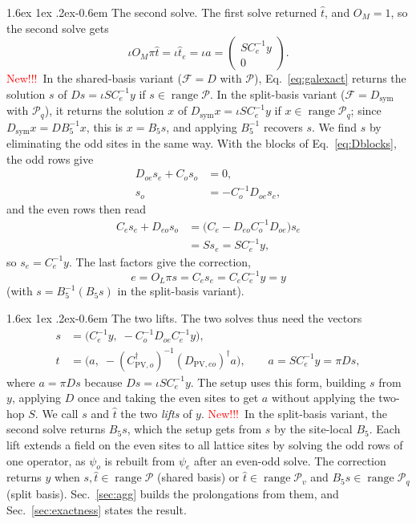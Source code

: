 \documentclass[11pt,a4paper]{article}
\makeatletter
\newif\ifshownew \shownewtrue
\DeclareRobustCommand\New{\ifshownew\textcolor{red}{New!!!}\ \else\ignorespaces\fi}
\renewcommand\paragraph{\@startsection{paragraph}{4}{\z@}%
  {1.6ex \@plus 1ex \@minus .2ex}{-0.6em}%
  {\normalfont\normalsize\itshape}}
\numberwithin{equation}{section}
\newcommand{\dg}{^{\dagger}}
\newcommand{\Pro}{\mathcal P}
\newcommand{\Pq}{\Pro_q}
\newcommand{\Pv}{\Pro_v}
\newcommand{\Dsym}{D_{\mathrm{sym}}}
\newcommand{\Ce}{C_{e}}
\newcommand{\Co}{C_{o}}
\newcommand{\Cpvo}{C_{\mathrm{PV},o}}
\makeatother
\begin{document}
\paragraph{The second solve.} The first solve returned $\hat t$, and $O_M=1$, so the second solve
gets
\begin{equation*}
\iota O_M\pi\hat t=\iota\hat t_e=\iota a=\begin{pmatrix}S\Ce^{-1}y\\0\end{pmatrix}.
\end{equation*}
\New In the shared-basis variant ($\mathcal F=D$ with $\Pro$), Eq.~\eqref{eq:galexact} returns the
solution $s$ of $Ds=\iota S\Ce^{-1}y$ if $s\in\operatorname{range}\Pro$. In the split-basis variant
($\mathcal F=\Dsym$ with $\Pq$), it returns the solution $x$ of $\Dsym x=\iota S\Ce^{-1}y$ if
$x\in\operatorname{range}\Pq$; since $\Dsym x=DB_5^{-1}x$, this is $x=B_5s$, and applying
$B_5^{-1}$ recovers $s$. We find $s$ by eliminating the odd sites in the same way. With the blocks of
Eq.~\eqref{eq:Dblocks}, the odd rows give
\begin{align*}
D_{oe}s_e+\Co s_o&=0,\\
s_o&=-\Co^{-1}D_{oe}s_e ,
\end{align*}
and the even rows then read
\begin{align*}
\Ce s_e+D_{eo}s_o&=\big(\Ce-D_{eo}\Co^{-1}D_{oe}\big)s_e\\
&=Ss_e=S\Ce^{-1}y ,
\end{align*}
so $s_e=\Ce^{-1}y$. The last factors give the correction,
\begin{equation*}
e=O_L\pi s=\Ce s_e=\Ce\Ce^{-1}y=y
\end{equation*}
(with $s=B_5^{-1}(B_5s)$ in the split-basis variant).

\paragraph{The two lifts.} The two solves thus need the vectors
\begin{equation}
\begin{aligned}
s&=\big(\Ce^{-1}y,\;-\Co^{-1}D_{oe}\Ce^{-1}y\big),\\
\hat t&=\big(a,\;-(\Cpvo\dg)^{-1}(D_{\mathrm{PV},eo})\dg a\big),\qquad a=S\Ce^{-1}y=\pi Ds ,
\end{aligned}
\label{eq:lifts}
\end{equation}
where $a=\pi Ds$ because $Ds=\iota S\Ce^{-1}y$. The setup uses this form, building $s$ from $y$,
applying $D$ once and taking the even sites to get $a$ without applying the two-hop $S$. We call $s$ and $\hat t$ the two \emph{lifts} of $y$.
\New In the split-basis variant, the second solve returns $B_5s$, which the setup gets from $s$ by
the site-local $B_5$. Each lift extends a field on the even sites to all lattice sites by solving
the odd rows of one operator, as $\psi_o$ is rebuilt from $\psi_e$ after an even-odd solve. The
correction returns $y$ when $s,\hat t\in\operatorname{range}\Pro$ (shared basis) or
$\hat t\in\operatorname{range}\Pv$ and $B_5s\in\operatorname{range}\Pq$ (split basis).
Sec.~\ref{sec:agg} builds the prolongations from them, and Sec.~\ref{sec:exactness} states the
result.
\end{document}
